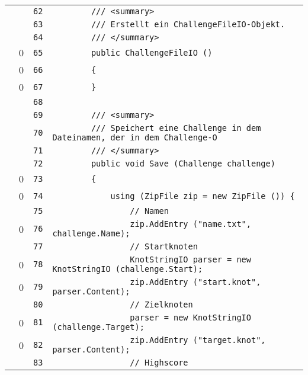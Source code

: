 \documentclass[a4paper,10pt]{article}
\begin{document}
\begin{longtable}[l]{lrrl}
\cellcolor{gray} &  & \verb~62~ & \verb~        /// <summary>~\\
\cellcolor{gray} &  & \verb~63~ & \verb~        /// Erstellt ein ChallengeFileIO-Objekt.~\\
\cellcolor{gray} &  & \verb~64~ & \verb~        /// </summary>~\\
\cellcolor{red} & 0 & \verb~65~ & \verb~        public ChallengeFileIO ()~\\
\cellcolor{red} & 0 & \verb~66~ & \verb~        {~\\
\cellcolor{red} & 0 & \verb~67~ & \verb~        }~\\
\cellcolor{gray} &  & \verb~68~ & \verb~~\\
\cellcolor{gray} &  & \verb~69~ & \verb~        /// <summary>~\\
\cellcolor{gray} &  & \verb~70~ & \verb~        /// Speichert eine Challenge in dem Dateinamen, der in dem Challenge-O~\\
\cellcolor{gray} &  & \verb~71~ & \verb~        /// </summary>~\\
\cellcolor{gray} &  & \verb~72~ & \verb~        public void Save (Challenge challenge)~\\
\cellcolor{red} & 0 & \verb~73~ & \verb~        {~\\
\cellcolor{red} & 0 & \verb~74~ & \verb~            using (ZipFile zip = new ZipFile ()) {~\\
\cellcolor{gray} &  & \verb~75~ & \verb~                // Namen~\\
\cellcolor{red} & 0 & \verb~76~ & \verb~                zip.AddEntry ("name.txt", challenge.Name);~\\
\cellcolor{gray} &  & \verb~77~ & \verb~                // Startknoten~\\
\cellcolor{red} & 0 & \verb~78~ & \verb~                KnotStringIO parser = new KnotStringIO (challenge.Start);~\\
\cellcolor{red} & 0 & \verb~79~ & \verb~                zip.AddEntry ("start.knot", parser.Content);~\\
\cellcolor{gray} &  & \verb~80~ & \verb~                // Zielknoten~\\
\cellcolor{red} & 0 & \verb~81~ & \verb~                parser = new KnotStringIO (challenge.Target);~\\
\cellcolor{red} & 0 & \verb~82~ & \verb~                zip.AddEntry ("target.knot", parser.Content);~\\
\cellcolor{gray} &  & \verb~83~ & \verb~                // Highscore~\\

\end{longtable}
\end{document}
